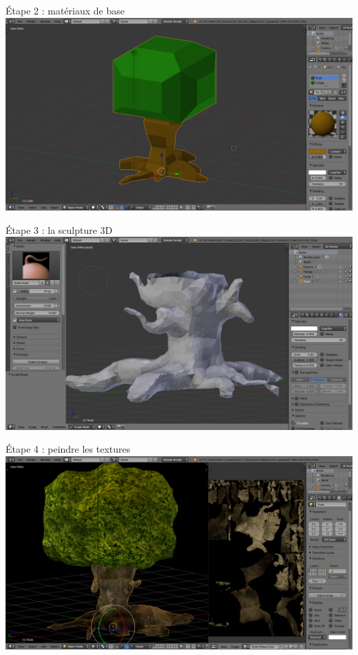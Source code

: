 \documentclass[compress]{beamer}
\begin{document}

\begin{frame}{Étape 2 : matériaux de base}
        \centering
        \includegraphics[width=0.9\linewidth]{tree2.png}
\end{frame}



\begin{frame}{Étape 3 : la sculpture 3D}
        \centering
        \includegraphics[width=0.9\linewidth]{tree4.png}
\end{frame}



\begin{frame}{Étape 4 : peindre les textures}
        \centering
        \includegraphics[width=0.9\linewidth]{tree5-2.png}
\end{frame}
\end{document}
